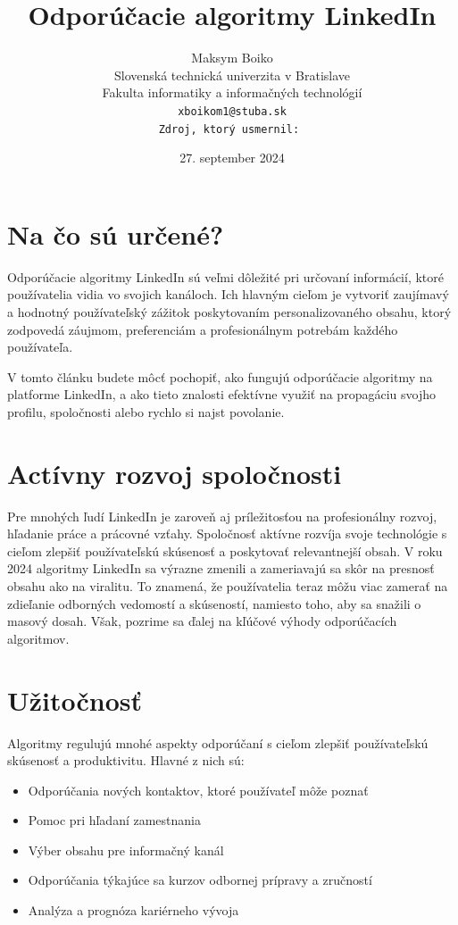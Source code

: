\documentclass[slovak,a4paper]{coursepaper}
\title{Odporúčacie algoritmy LinkedIn\centering}
\author{Maksym Boiko\\[2pt]
{ Slovenská technická univerzita v Bratislave}\\
{ Fakulta informatiky a informačných technológií}\\
{\texttt{xboikom1@stuba.sk}}\\
{\texttt{Zdroj, ktorý usmernil:~\cite{1}}}
}
\date{\small 27. september 2024}
\begin{document}
\maketitle

\section{Na čo sú určené?}
Odporúčacie algoritmy LinkedIn sú veľmi dôležité pri určovaní informácií, ktoré používatelia vidia vo svojich kanáloch. Ich hlavným cieľom je vytvoriť zaujímavý a hodnotný používateľský zážitok poskytovaním personalizovaného obsahu, ktorý zodpovedá záujmom, preferenciám a profesionálnym potrebám každého používateľa.

V tomto článku budete môcť pochopiť, ako fungujú odporúčacie algoritmy na platforme LinkedIn, a ako tieto znalosti efektívne využiť na propagáciu svojho profilu, spoločnosti alebo rychlo si najst povolanie.~\cite{2}

\section{Actívny rozvoj spoločnosti} \label{rozvoj spoločnosti}

Pre mnohých ľudí LinkedIn je zaroveň aj príležitosťou na profesionálny rozvoj, hľadanie práce a prácovné vzťahy.
Spoločnosť aktívne rozvíja svoje technológie s cieľom zlepšiť používateľskú skúsenosť a poskytovať relevantnejší obsah. V roku 2024 algoritmy LinkedIn sa výrazne zmenili a zameriavajú sa skôr na presnosť obsahu ako na viralitu. To znamená, že používatelia teraz môžu viac zamerať na zdieľanie odborných vedomostí a skúseností, namiesto toho, aby sa snažili o masový dosah. Však, pozrime sa ďalej na kľúčové výhody odporúčacích algoritmov.

\section{Užitočnosť} \label{Užitočnosť}
Algoritmy regulujú mnohé aspekty odporúčaní s cieľom zlepšiť používateľskú skúsenosť a produktivitu. Hlavné z nich sú:

\begin{itemize}
	\item Odporúčania nových kontaktov, ktoré používateľ môže poznať
	\item Pomoc pri hľadaní zamestnania
	\item Výber obsahu pre informačný kanál
	\item Odporúčania týkajúce sa kurzov odbornej prípravy a zručností
	\item Analýza a prognóza kariérneho vývoja
  \end{itemize}
\end{document}
